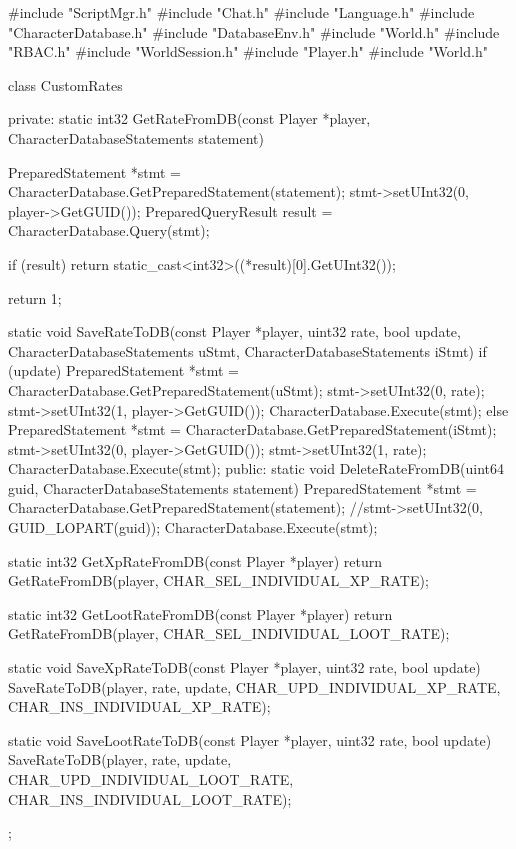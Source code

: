 #include "ScriptMgr.h"
#include "Chat.h"
#include "Language.h"
#include "CharacterDatabase.h"
#include "DatabaseEnv.h"
#include "World.h"
#include "RBAC.h"
#include "WorldSession.h"
#include "Player.h"
#include "World.h"

class CustomRates
{
private:
	static int32 GetRateFromDB(const Player *player, CharacterDatabaseStatements statement)
	{
		PreparedStatement *stmt = CharacterDatabase.GetPreparedStatement(statement);
		stmt->setUInt32(0, player->GetGUID());
		PreparedQueryResult result = CharacterDatabase.Query(stmt);

		if (result)
			return static_cast<int32>((*result)[0].GetUInt32());

		return 1;
	}

	static void SaveRateToDB(const Player *player, uint32 rate, bool update, CharacterDatabaseStatements uStmt, CharacterDatabaseStatements iStmt)
	{
		if (update)
		{
			PreparedStatement *stmt = CharacterDatabase.GetPreparedStatement(uStmt);
			stmt->setUInt32(0, rate);
			stmt->setUInt32(1, player->GetGUID());
			CharacterDatabase.Execute(stmt);
		}
		else
		{
			PreparedStatement *stmt = CharacterDatabase.GetPreparedStatement(iStmt);
			stmt->setUInt32(0, player->GetGUID());
			stmt->setUInt32(1, rate);
			CharacterDatabase.Execute(stmt);
		}
	}
public:
	static void DeleteRateFromDB(uint64 guid, CharacterDatabaseStatements statement)
	{
		PreparedStatement *stmt = CharacterDatabase.GetPreparedStatement(statement);
		//stmt->setUInt32(0, GUID_LOPART(guid));
		CharacterDatabase.Execute(stmt);
	}

	static int32 GetXpRateFromDB(const Player *player)
	{
		return GetRateFromDB(player, CHAR_SEL_INDIVIDUAL_XP_RATE);
	}

	static int32 GetLootRateFromDB(const Player *player)
	{
		return GetRateFromDB(player, CHAR_SEL_INDIVIDUAL_LOOT_RATE);
	}

	static void SaveXpRateToDB(const Player *player, uint32 rate, bool update)
	{
		SaveRateToDB(player, rate, update, CHAR_UPD_INDIVIDUAL_XP_RATE, CHAR_INS_INDIVIDUAL_XP_RATE);
	}

	static void SaveLootRateToDB(const Player *player, uint32 rate, bool update)
	{
		SaveRateToDB(player, rate, update, CHAR_UPD_INDIVIDUAL_LOOT_RATE, CHAR_INS_INDIVIDUAL_LOOT_RATE);
	}
};

